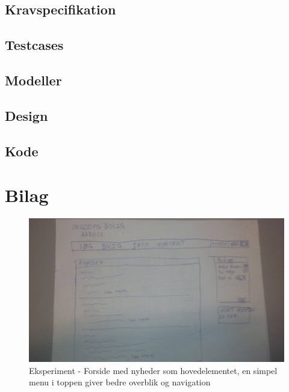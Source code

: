 \documentclass[12pt, a4paper]{report}
\begin{document}
\section{Kravspecifikation}

\section{Testcases}

\section{Modeller}

\section{Design}

\section{Kode}

\chapter{Bilag}

\begin{figure}[ht]
\includegraphics[scale=0.14]{eksperiment_forside}
\caption{Eksperiment - Forside med nyheder som hovedelementet, en simpel menu i toppen giver bedre overblik og navigation}
\label{e_forside}
\end{figure}
\end{document}
